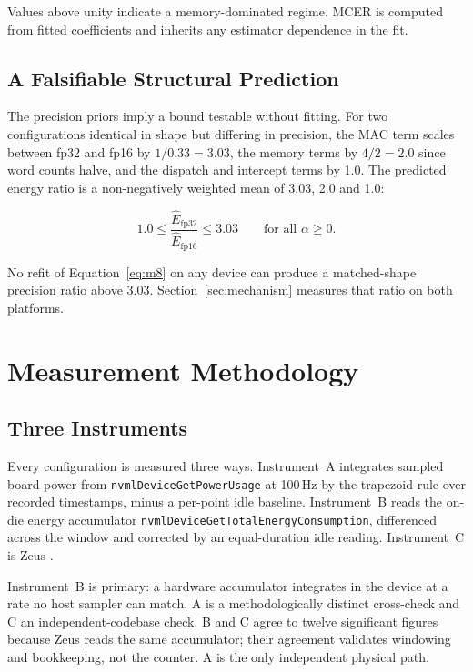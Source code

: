 \documentclass[conference]{IEEEtran}
\begin{document}
Values above unity indicate a memory-dominated regime. MCER is computed from
fitted coefficients and inherits any estimator dependence in the fit.

\subsection{A Falsifiable Structural Prediction}
\label{sec:ceiling}

The precision priors imply a bound testable without fitting. For two
configurations identical in shape but differing in precision, the MAC term
scales between fp32 and fp16 by $1/0.33 = 3.03$, the memory terms by $4/2
= 2.0$ since word counts halve, and the dispatch and intercept terms by 1.0.
The predicted energy ratio is a non-negatively weighted mean of 3.03, 2.0
and 1.0:

\begin{equation}
1.0 \leq \frac{\hat{E}_{\mathrm{fp32}}}{\hat{E}_{\mathrm{fp16}}} \leq 3.03
\qquad \text{for all } \alpha \geq 0 .
\label{eq:ceiling}
\end{equation}

No refit of Equation~\ref{eq:m8} on any device can produce a matched-shape
precision ratio above 3.03. Section~\ref{sec:mechanism} measures that ratio
on both platforms.

\section{Measurement Methodology}
\label{sec:method}

\subsection{Three Instruments}

Every configuration is measured three ways. Instrument~A integrates sampled
board power from \texttt{nvmlDeviceGetPowerUsage} at 100\,Hz by the
trapezoid rule over recorded timestamps, minus a per-point idle baseline.
Instrument~B reads the on-die energy accumulator
\texttt{nvmlDeviceGetTotalEnergyConsumption}, differenced across the window
and corrected by an equal-duration idle reading. Instrument~C is Zeus
\cite{zeus}.

Instrument~B is primary: a hardware accumulator integrates in the device at
a rate no host sampler can match. A is a methodologically distinct
cross-check and C an independent-codebase check. B and C agree to twelve
significant figures because Zeus reads the same accumulator; their
agreement validates windowing and bookkeeping, not the counter. A is the
only independent physical path.
\end{document}
